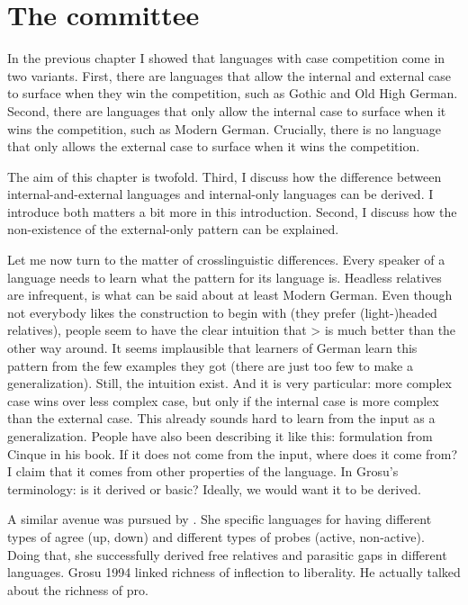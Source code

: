 
\chapter{The committee}\label{ch:relativization}

In the previous chapter I showed that languages with case competition come in two variants. First, there are languages that allow the internal and external case to surface when they win the competition, such as Gothic and Old High German. Second, there are languages that only allow the internal case to surface when it wins the competition, such as Modern German. Crucially, there is no language that only allows the external case to surface when it wins the competition.

The aim of this chapter is twofold. Third, I discuss how the difference between internal-and-external languages and internal-only languages can be derived. I introduce both matters a bit more in this introduction. Second, I discuss how the non-existence of the external-only pattern can be explained.

Let me now turn to the matter of crosslinguistic differences. Every speaker of a language needs to learn what the pattern for its language is. Headless relatives are infrequent, is what can be said about at least Modern German. Even though not everybody likes the construction to begin with (they prefer (light-)headed relatives), people seem to have the clear intuition that > is much better than the other way around. It seems implausible that learners of German learn this pattern from the few examples they got (there are just too few to make a generalization). Still, the intuition exist. And it is very particular: more complex case wins over less complex case, but only if the internal case is more complex than the external case. This already sounds hard to learn from the input as a generalization. People have also been describing it like this: formulation from Cinque in his book. If it does not come from the input, where does it come from? I claim that it comes from other properties of the language. In Grosu's terminology: is it derived or basic? Ideally, we would want it to be derived.

A similar avenue was pursued by \citealt{himmelreich2017}. She specific languages for having different types of agree (up, down) and different types of probes (active, non-active). Doing that, she successfully derived free relatives and parasitic gaps in different languages. Grosu 1994 linked richness of inflection to liberality. He actually talked about the richness of pro.

